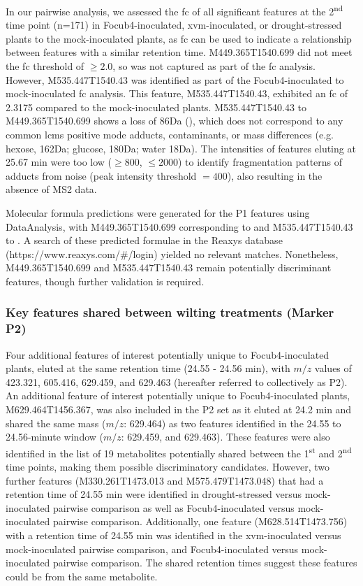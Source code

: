 In our pairwise analysis, we assessed the \acf{fc} of all significant features at the 2\textsuperscript{nd} time point (n=171) in \ac{Focub4}-inoculated, \ac{xvm}-inoculated, or drought-stressed plants to the mock-inoculated plants, as \ac{fc} can be used to indicate a relationship between features with a similar retention time. M449.365T1540.699 did not meet the \ac{fc} threshold of $\ge2.0$, so was not captured as part of the \ac{fc} analysis. However, M535.447T1540.43 was identified as part of the \ac{Focub4}-inoculated to mock-inoculated \ac{fc} analysis. This feature, M535.447T1540.43, exhibited an \ac{fc} of 2.3175 compared to the mock-inoculated plants. M535.447T1540.43 to M449.365T1540.699 shows a loss of 86Da (), which does not correspond to any common \ac{lcms} positive mode adducts, contaminants, or mass differences (e.g. hexose, 162Da; glucose, 180Da; water 18Da). The intensities of features eluting at 25.67 min were too low ($\geq800$, $\leq2000$) to identify fragmentation patterns of adducts from noise (peak intensity threshold $=400$), also resulting in the absence of MS2 data. 

Molecular formula predictions were generated for the P1 features using DataAnalysis, with M449.365T1540.699 corresponding to  and M535.447T1540.43 to . A search of these predicted formulae in the Reaxys database (https://www.reaxys.com/#/login) yielded no relevant matches. Nonetheless, M449.365T1540.699 and M535.447T1540.43 remain potentially discriminant features, though further validation is required.

\subsubsection{Key features shared between wilting treatments (Marker P2)}

Four additional features of interest potentially unique to \ac{Focub4}-inoculated plants, eluted at the same retention time (24.55 - 24.56 min), with $m/z$ values of 423.321, 605.416, 629.459, and 629.463 (hereafter referred to collectively as P2). An additional feature of interest potentially unique to \ac{Focub4}-inoculated plants, M629.464T1456.367, was also included in the P2 set as it eluted at 24.2 min and shared the same mass ($m/z$: 629.464) as two features identified in the 24.55 to 24.56-minute window ($m/z$: 629.459, and 629.463). These features were also identified in the list of 19 metabolites potentially shared between the 1\textsuperscript{st} and 2\textsuperscript{nd} time points, making them possible discriminatory candidates. However, two further features (M330.261T1473.013 and M575.479T1473.048) that had a retention time of 24.55 min were identified in drought-stressed versus mock-inoculated pairwise comparison as well as \ac{Focub4}-inoculated versus mock-inoculated pairwise comparison. Additionally, one feature (M628.514T1473.756) with a retention time of 24.55 min was identified in the \ac{xvm}-inoculated versus mock-inoculated pairwise comparison, and \ac{Focub4}-inoculated versus mock-inoculated pairwise comparison. The shared retention times suggest these features could be from the same metabolite.

